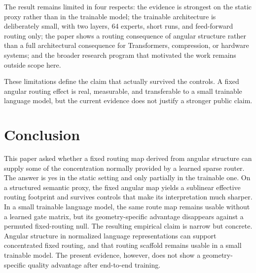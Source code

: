 \documentclass[10pt,letterpaper]{article}
\begin{document}
The result remains limited in four respects: the evidence is strongest on the static proxy rather than in the trainable model; the trainable architecture is deliberately small, with two layers, 64 experts, short runs, and feed-forward routing only; the paper shows a routing consequence of angular structure rather than a full architectural consequence for Transformers, compression, or hardware systems; and the broader research program that motivated the work remains outside scope here.

These limitations define the claim that actually survived the controls. A fixed angular routing effect is real, measurable, and transferable to a small trainable language model, but the current evidence does not justify a stronger public claim.

\section{Conclusion}
This paper asked whether a fixed routing map derived from angular structure can supply some of the concentration normally provided by a learned sparse router. The answer is yes in the static setting and only partially in the trainable one. On a structured semantic proxy, the fixed angular map yields a sublinear effective routing footprint and survives controls that make its interpretation much sharper. In a small trainable language model, the same route map remains usable without a learned gate matrix, but its geometry-specific advantage disappears against a permuted fixed-routing null. The resulting empirical claim is narrow but concrete. Angular structure in normalized language representations can support concentrated fixed routing, and that routing scaffold remains usable in a small trainable model. The present evidence, however, does not show a geometry-specific quality advantage after end-to-end training.
\end{document}
